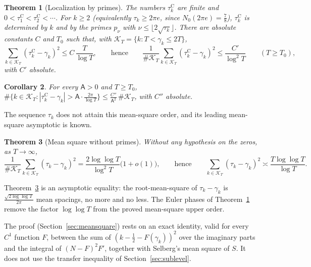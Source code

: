 \documentclass[11pt,a4paper]{article}
\makeatletter
\numberwithin{equation}{section}
\DeclareRobustCommand{\CGref}[1]{\ref{#1}}
\let\CG@origref\ref
\newcommand{\CG@gettip}[1]{\@ifundefined{CGTip@#1}{#1}{\csname CGTip@#1\endcsname}}
\DeclareRobustCommand{\CGref}[1]{\pdftooltip{\CG@origref{#1}}{\CG@gettip{#1}}}
\newtheorem{theorem}{Theorem}[section]
\newtheorem{corollary}[theorem]{Corollary}
\theoremstyle{definition}
\theoremstyle{remark}
\newcommand{\Nz}{N_0} %
\newcommand{\Kc}{\mathcal K}
\makeatother
\begin{document}
\begin{theorem}[Localization by primes]\label{thm:sublevel}
The numbers $\tau_{k}^{\mathrm C}$ are finite and $0<\tau_{1}^{\mathrm C}<\tau_{2}^{\mathrm C}<\cdots$. For $k\ge2$ (equivalently $\tau_k\ge2\pi e$, since $\Nz(2\pi e)=\frac78$), $\tau_{k}^{\mathrm C}$ is determined by $k$ and by the primes $p_\nu$ with $\nu\le\lfloor2\sqrt{\tau_k}\rfloor$. There are absolute constants $C$ and $T_0$ such that, with $\Kc_T=\{k:T<\gamma_k\le2T\}$,
\begin{equation}
\sum_{k\in\Kc_T}(\tau_{k}^{\mathrm C}-\gamma_k)^2\le C\,\frac T{\log T},\qquad\text{hence}\qquad \frac1{\#\Kc_T}\sum_{k\in\Kc_T}(\tau_{k}^{\mathrm C}-\gamma_k)^2\le\frac{C'}{\log^2T}\qquad(T\ge T_0),
\label{eq:main_sublevel}
\end{equation}
with $C'$ absolute.
\end{theorem}

\begin{corollary}\label{cor:proportion}
For every $\mathsf A>0$ and $T\ge T_0$, $\#\{k\in\Kc_T:|\tau_{k}^{\mathrm C}-\gamma_k|>\mathsf A\cdot\frac{2\pi}{\log T}\}\le\frac{C''}{\mathsf A^2}\,\#\Kc_T$, with $C''$ absolute.
\end{corollary}

The sequence $\tau_k$ does not attain this mean-square order, and its leading mean-square asymptotic is known.

\begin{theorem}[Mean square without primes]\label{thm:meansquare}
Without any hypothesis on the zeros, as $T\to\infty$,
\begin{equation}
\frac1{\#\Kc_T}\sum_{k\in\Kc_T}(\tau_k-\gamma_k)^2=\frac{2\log\log T}{\log^2T}\bigl(1+o(1)\bigr),\qquad\text{hence}\qquad \sum_{k\in\Kc_T}(\tau_k-\gamma_k)^2\asymp\frac{T\log\log T}{\log T}.
\label{eq:meansquare}
\end{equation}
\end{theorem}

Theorem~\CGref{thm:meansquare} is an asymptotic equality: the root-mean-square of $\tau_k-\gamma_k$ is $\frac{\sqrt{2\log\log T}}{2\pi}$ mean spacings, no more and no less. The Euler phases of Theorem~\CGref{thm:sublevel} remove the factor $\log\log T$ from the proved mean-square upper order. \par
The proof (Section~\CGref{sec:meansquare}) rests on an exact identity, valid for every $C^1$ function $F$, between the sum of $(k-\frac12-F(\gamma_k))^2$ over the imaginary parts and the integral of $(N-F)^2F'$, together with Selberg's mean square of $S$. It does not use the transfer inequality of Section~\CGref{sec:sublevel}.
\end{document}
